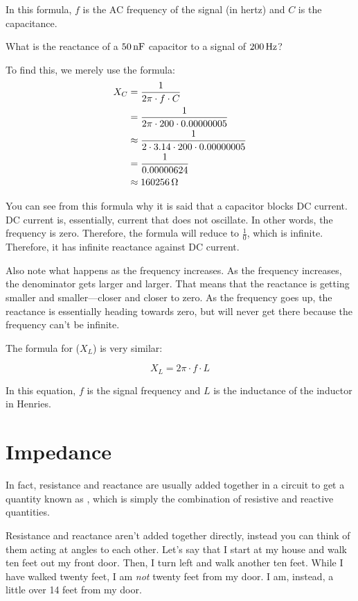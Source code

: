 In this formula, $f$ is the AC frequency of the signal (in hertz) and $C$ is the capacitance.

\begin{exampleprob}
What is the reactance of a $50\,\si{\nano\farad}$ capacitor to a signal of $200\,\si{\hertz}$?

To find this, we merely use the formula:
\begin{align*}
X_C &= \frac{1}{2\pi\cdot f\cdot C} \\
 &= \frac{1}{2\pi\cdot 200\cdot 0.00000005} \\
 &\approx \frac{1}{2\cdot 3.14\cdot200\cdot 0.00000005} \\
 &= \frac{1}{0.00000624} \\
 &\approx 160256\,\si{\ohm}
\end{align*}
\end{exampleprob}

You can see from this formula why it is said that a capacitor blocks DC current.
DC current is, essentially, current that does not oscillate.
In other words, the frequency is zero.
Therefore, the formula will reduce to $\frac{1}{0}$, which is infinite.
Therefore, it has infinite reactance against DC current.

Also note what happens as the frequency increases.
As the frequency increases, the denominator gets larger and larger.
That means that the reactance is getting smaller and smaller---closer and closer to zero.
As the frequency goes up, the reactance is essentially heading towards zero, but will never get there because the frequency can't be infinite.

The formula for  ($X_L$) is very similar:

\begin{equation}
\label{eqReactanceInductor}
X_L = 2\pi\cdot f\cdot L
\end{equation}

In this equation, $f$ is the signal frequency and $L$ is the inductance of the inductor in Henries.

\section{Impedance}
\label{secImpedance}
In fact, resistance and reactance are usually added together in a circuit to get a quantity known as , which is simply the combination of resistive and reactive quantities.

Resistance and reactance aren't added together directly, instead you can think of them acting at angles to each other.
Let's say that I start at my house and walk ten feet out my front door.
Then, I turn left and walk another ten feet.
While I have walked twenty feet, I am \emph{not} twenty feet from my door.
I am, instead, a little over 14 feet from my door.

